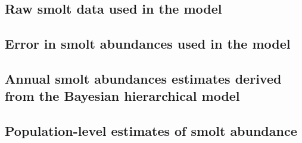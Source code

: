 \documentclass[12pt]{article}
\begin{document}
\clearpage



\clearpage



\clearpage



\clearpage

\subsection*{Raw smolt data used in the model}



\clearpage

\subsection*{Error in smolt abundances used in the model}



\clearpage

\subsection*{Annual smolt abundances estimates derived from the Bayesian hierarchical model}


\clearpage

\subsection*{Population-level estimates of smolt abundance}




\clearpage




\end{document}
